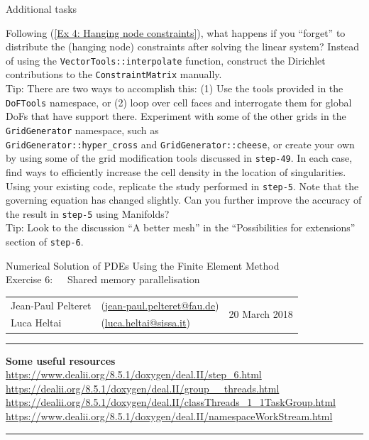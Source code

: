 \documentclass[11pt]{exam}
\makeatletter
\newcommand{\makeheader}[3]{%
\setcounter{question}{0}
\begin{center}
{\sc Numerical Solution of PDEs Using the Finite Element Method}\vspace{2ex}\\
{\sc Exercise #1:\ \ \ #2}\vspace{2ex}\\
\begin{tabular*}{\textwidth}{ll @{\extracolsep{\fill}}r}
Jean-Paul Pelteret & (\url{jean-paul.pelteret@fau.de}) & \multirow{2}{*}{#3} \\
Luca Heltai & (\url{luca.heltai@sissa.it}) & \\
\end{tabular*}
\end{center}
}
\newcommand{\makeresources}[1]{%
\rule{\textwidth}{0.6mm}
\textbf{Some useful resources}\\[1.5ex]
#1 \par
\rule{\textwidth}{0.6mm}
}
\makeatother
\begin{document}
\begin{questions}
\question Additional tasks
\begin{parts}
\bonuspart Following (\ref{Ex 4: Hanging node constraints}), what happens if you ``forget'' to distribute the (hanging node) constraints after solving the linear system?
\bonuspart Instead of using the \verb|VectorTools::interpolate| function, construct the Dirichlet contributions to the \verb|ConstraintMatrix| manually. \\
Tip: There are two ways to accomplish this: (1) Use the tools provided in the \verb|DoFTools| namespace, or (2) loop over cell faces and interrogate them for global DoFs that have support there.
\bonuspart Experiment with some of the other grids in the \verb|GridGenerator| namespace, such as \\\verb|GridGenerator::hyper_cross| and \verb|GridGenerator::cheese|, or create your own by using some of the grid modification tools discussed in \verb|step-49|.
In each case, find ways to efficiently increase the cell density in the location of singularities.
\bonuspart Using your existing code, replicate the study performed in \verb|step-5|. 
Note that the governing equation has changed slightly. 
Can you further improve the accuracy of the result in \verb|step-5| using Manifolds? \\
Tip: Look to the discussion ``A better mesh'' in the ``Possibilities for extensions'' section of \verb|step-6|.
\end{parts}

\end{questions}




\clearpage
\makeheader{6}{Shared memory parallelisation}{20 March 2018}
\makeresources{%
\url{https://www.dealii.org/8.5.1/doxygen/deal.II/step_6.html} \\
\url{https://dealii.org/8.5.1/doxygen/deal.II/group__threads.html} \\
\url{https://dealii.org/8.5.1/doxygen/deal.II/classThreads_1_1TaskGroup.html} \\
\url{https://www.dealii.org/8.5.1/doxygen/deal.II/namespaceWorkStream.html}
}
\end{document}
